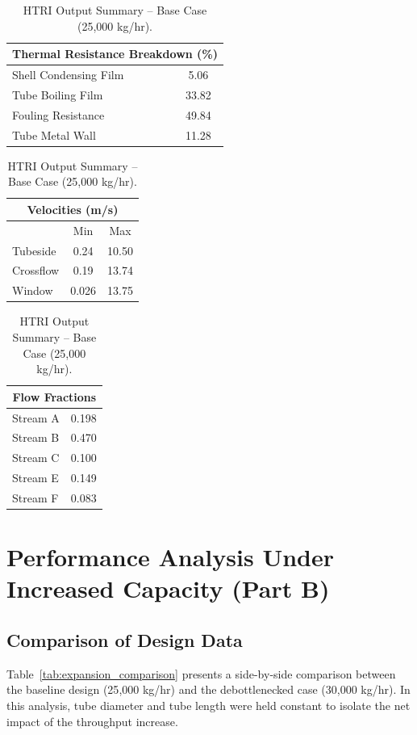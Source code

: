 \documentclass[12pt]{article}
\begin{document}
\begin{table}[H]
\centering
\small
\begin{tabular}{lc}
\toprule
\multicolumn{2}{c}{\textbf{Thermal Resistance Breakdown (\%)}} \\
\midrule
Shell Condensing Film & 5.06 \\
Tube Boiling Film & 33.82 \\
Fouling Resistance & 49.84 \\
Tube Metal Wall & 11.28 \\
\bottomrule
\end{tabular}
\qquad
\begin{tabular}{lcc}
\toprule
\multicolumn{3}{c}{\textbf{Velocities (m/s)}} \\
\midrule
  & Min & Max \\
Tubeside & 0.24 & 10.50 \\
Crossflow & 0.19 & 13.74 \\
Window & 0.026 & 13.75 \\
\bottomrule
\end{tabular}
\qquad
\begin{tabular}{lc}
\toprule
\multicolumn{2}{c}{\textbf{Flow Fractions}} \\
\midrule
Stream A & 0.198 \\
Stream B & 0.470 \\
Stream C & 0.100 \\
Stream E & 0.149 \\
Stream F & 0.083 \\
\bottomrule
\end{tabular}
\caption{HTRI Output Summary -- Base Case (25{,}000 kg/hr).}
\label{tab:base_output_summary}
\end{table}

\section{Performance Analysis Under Increased Capacity (Part B)}

\subsection{Comparison of Design Data}

Table~\ref{tab:expansion_comparison} presents a side-by-side comparison between the baseline design (25{,}000 kg/hr) and the debottlenecked case (30{,}000 kg/hr). In this analysis, tube diameter and tube length were held constant to isolate the net impact of the throughput increase.
\end{document}
